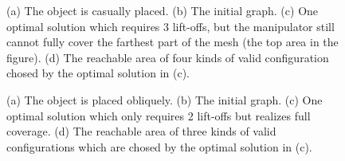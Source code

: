 \documentclass[journal]{IEEEtran}
\begin{document}
\begin{figure}[t]
\centering
{}
\caption{(a) The object is casually placed. (b) The initial graph. (c) One optimal solution which requires 3 lift-offs, but the manipulator still cannot fully cover the farthest part of the mesh (the top area in the figure). (d) The reachable area of four kinds of valid configuration chosed by the optimal solution in (c). 
}\label{figflatwise}
\end{figure}
\begin{figure}[t]
\centering
{}
\caption{(a) The object is placed obliquely. (b) The initial graph. (c) One optimal solution which only requires 2 lift-offs but realizes full coverage. (d) The reachable area of three kinds of valid configurations which are chosed by the optimal solution in (c). 
}\label{figsloped}
\end{figure}
\end{document}
